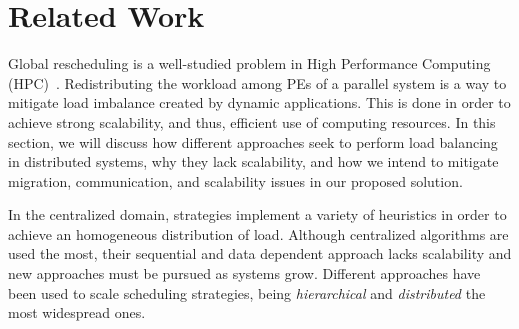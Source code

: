 \section{Related Work} \label{sec:rw}

%

Global rescheduling is a well-studied problem in High Performance Computing (HPC)~\cite{Deveci2015,Zheng2010}.
Redistributing the workload among PEs of a parallel system is a way to mitigate load imbalance created by dynamic applications.
This is done in order to achieve strong scalability, and thus, efficient use of computing resources.
In this section, we will discuss how different approaches seek to perform load balancing in distributed systems, why they lack scalability, and how we intend to mitigate migration, communication, and scalability issues in our proposed solution.


In the centralized domain, strategies implement a variety of heuristics in order to achieve an homogeneous distribution of load.
Although centralized algorithms are used the most, their sequential and data dependent approach lacks scalability and new approaches must be pursued as systems grow.
Different approaches have been used to scale scheduling strategies, being \textit{hierarchical} and \textit{distributed} the most widespread ones.


